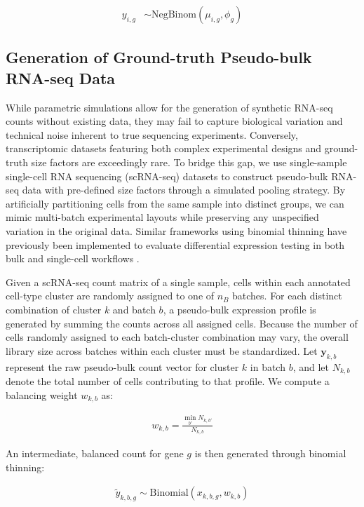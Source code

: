 \documentclass[10pt,letterpaper]{article}
\begin{document}
\begin{align}
    y_{i,g} &\sim \text{NegBinom}(\mu_{i,g}, \phi_g)
\end{align}

\subsection*{Generation of Ground-truth Pseudo-bulk RNA-seq Data}

While parametric simulations allow for the generation of synthetic RNA-seq counts without existing data, they may fail to capture biological variation and technical noise inherent to true sequencing experiments. 
Conversely, transcriptomic datasets featuring both complex experimental designs and ground-truth size factors are exceedingly rare. 
To bridge this gap, we use single-sample single-cell RNA sequencing (scRNA-seq) datasets to construct pseudo-bulk RNA-seq data with pre-defined size factors through a simulated pooling strategy. 
By artificially partitioning cells from the same sample into distinct groups, we can mimic multi-batch experimental layouts while preserving any unspecified variation in the original data.
Similar frameworks using binomial thinning have previously been implemented to evaluate differential expression testing in both bulk and single-cell workflows \cite{gerardDatabasedRNAseqSimulations2020}.

Given a scRNA-seq count matrix of a single sample, cells within each annotated cell-type cluster are randomly assigned to one of $n_B$ batches. 
For each distinct combination of cluster $k$ and batch $b$, a pseudo-bulk expression profile is generated by summing the counts across all assigned cells. 
Because the number of cells randomly assigned to each batch-cluster combination may vary, the overall library size across batches within each cluster must be standardized. 
Let $\boldsymbol{y}_{k,b}$ represent the raw pseudo-bulk count vector for cluster $k$ in batch $b$, and let $N_{k,b}$ denote the total number of cells contributing to that profile. 
We compute a balancing weight $w_{k,b}$ as:

\begin{align}
w_{k,b} = \frac{\min_{b'} N_{k,b'}}{N_{k,b}}
\end{align}

An intermediate, balanced count for gene $g$ is then generated through binomial thinning:

\begin{align}
\tilde{y}_{k,b,g} \sim \text{Binomial}(x_{k,b,g}, w_{k,b})
\end{align}
\end{document}
